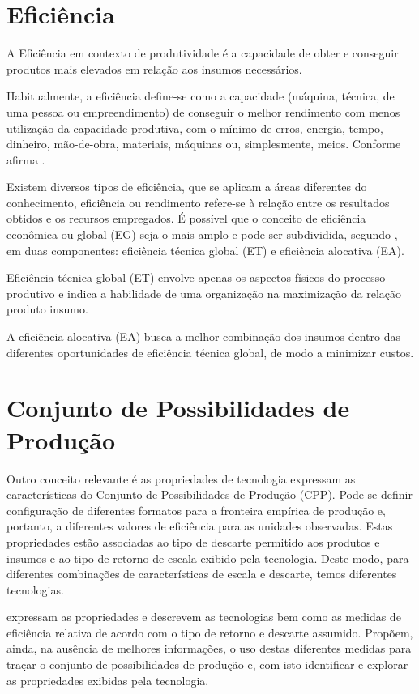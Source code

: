 \section{Eficiência}

A Eficiência em contexto de produtividade é a capacidade de obter e conseguir produtos mais elevados em relação aos insumos necessários.

Habitualmente, a eficiência define-se como a capacidade (máquina, técnica, de uma pessoa ou empreendimento) de conseguir o melhor rendimento com menos utilização da capacidade produtiva, com o mínimo de erros, energia, tempo, dinheiro, mão-de-obra, materiais, máquinas ou, simplesmente, meios. Conforme afirma .


Existem diversos tipos de eficiência, que se aplicam a áreas diferentes do conhecimento, eficiência ou rendimento refere-se à relação entre os resultados obtidos e os recursos empregados. É possível que o conceito de eficiência econômica ou global (EG) seja o mais amplo e pode ser subdividida, segundo , em duas componentes: eficiência técnica global (ET) e eficiência alocativa (EA).

Eficiência técnica global (ET) envolve apenas os aspectos físicos do processo produtivo e indica a habilidade de uma organização na maximização da relação produto insumo.

A eficiência alocativa (EA) busca a melhor combinação dos insumos dentro das diferentes oportunidades de eficiência técnica global, de modo a minimizar custos. 

\section{Conjunto de Possibilidades de Produção}

Outro conceito relevante é as propriedades de tecnologia expressam as características do Conjunto de Possibilidades de Produção (CPP). Pode-se definir configuração de diferentes formatos para a fronteira empírica de produção e, portanto, a diferentes valores de eficiência para as unidades observadas. Estas propriedades estão associadas ao tipo de descarte permitido aos produtos e insumos e ao tipo de retorno de escala exibido pela tecnologia. Deste modo, para diferentes combinações de características de escala e descarte, temos diferentes tecnologias.

 expressam as propriedades e descrevem as tecnologias bem como as medidas de eficiência relativa de acordo com o tipo de retorno e descarte assumido. Propõem, ainda, na ausência de melhores informações, o uso destas diferentes medidas para traçar o conjunto de possibilidades de produção e, com isto identificar e explorar as propriedades exibidas pela tecnologia.



